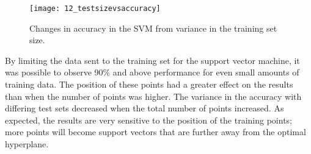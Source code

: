 \begin{figure}[ht]
    \centering
    \texttt{[image: 12\_testsizevsaccuracy]}
    \caption{Changes in accuracy in the SVM from variance in the training set size.}
    \label{fig:12_testsizevsaccuracy}
\end{figure}

By limiting the data sent to the training set for the support vector machine, it was possible to observe 90\% and above performance for even small amounts of training data. The position of these points had a greater effect on the results than when the number of points was higher. The variance in the accuracy with differing test sets decreased when the total number of points increased. As expected, the results are very sensitive to the position of the training points; more points will become support vectors that are further away from the optimal hyperplane.
\\







